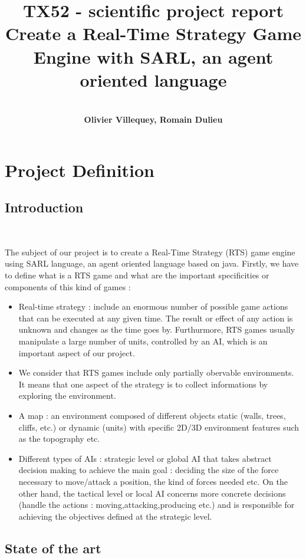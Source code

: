 \documentclass[a4paper,10pt]{book}
\title{\textbf{TX52 - scientific project report }\\
  Create a Real-Time Strategy Game Engine with SARL, an agent oriented language}
\author{~\\
  \textbf{Olivier Villequey, Romain Dulieu} }
\begin{document}
\maketitle

\tableofcontents

\chapter{Project Definition}

\section {Introduction}

~

The subject of our project is to create a Real-Time Strategy (RTS) game engine using SARL language, an agent oriented language based on java.
Firstly, we have to define what is a RTS game and what are the important specificities or components of this kind of games :
\begin{itemize}
 \item Real-time strategy : include an enormous number of possible game actions that can be executed at any given time. The result or effect of any action is unknown
  and changes as the time goes by. Furthurmore, RTS games usually manipulate a large number of units, controlled by an AI, which is an important aspect of our project. 
 \item We consider that RTS games include only partially obervable environments. It means that one aspect of the strategy is to collect informations by exploring the environment.
 \item A map : an environment composed of different objects static (walls, trees, cliffs, etc.) or dynamic (units) with specific 2D/3D environment features such as the topography etc.
 \item Different types of AIs : strategic level or global AI that takes abstract decision making to achieve the main goal : deciding the size of the force necessary to move/attack a position, the kind of forces needed etc. 
  On the other hand, the tactical level or local AI concerns more concrete decisions (handle the actions : moving,attacking,producing etc.) and is responsible for achieving the objectives defined at the strategic level.
\end{itemize}

\newpage

\section {State of the art}
\end{document}
